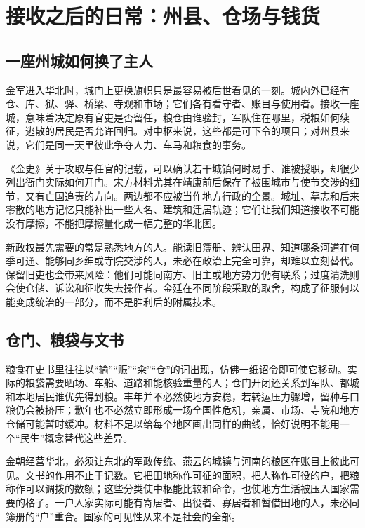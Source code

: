 \section{接收之后的日常：州县、仓场与钱货}

\subsection{一座州城如何换了主人}

金军进入华北时，城门上更换旗帜只是最容易被后世看见的一刻。城内外已经有仓、库、狱、驿、桥梁、寺观和市场；它们各有看守者、账目与使用者。接收一座城，意味着决定原有官吏是否留任，粮仓由谁验封，军队住在哪里，税粮如何续征，逃散的居民是否允许回归。对中枢来说，这些都是可下令的项目；对州县来说，它们是同一天里彼此争夺人力、车马和粮食的事务。

《金史》关于攻取与任官的记载，可以确认若干城镇何时易手、谁被授职，却很少列出衙门实际如何开门。宋方材料尤其在靖康前后保存了被围城市与使节交涉的细节，又有亡国追责的方向。两边都不应被当作地方行政的全景。城址、墓志和后来零散的地方记忆只能补出一些人名、建筑和迁居轨迹；它们让我们知道接收不可能没有摩擦，不能把摩擦量化成一幅完整的华北图。

新政权最先需要的常是熟悉地方的人。能读旧簿册、辨认田界、知道哪条河道在何季可通、能够同乡绅或寺院交涉的人，未必在政治上完全可靠，却难以立刻替代。保留旧吏也会带来风险：他们可能同南方、旧主或地方势力仍有联系；过度清洗则会使仓储、诉讼和征收失去操作者。金廷在不同阶段采取的取舍，构成了征服何以能变成统治的一部分，而不是胜利后的附属技术。

\subsection{仓门、粮袋与文书}

粮食在史书里往往以“输”“赈”“籴”“仓”的词出现，仿佛一纸诏令即可使它移动。实际的粮袋需要晒场、车船、道路和能核验重量的人；仓门开闭还关系到军队、都城和本地居民谁优先得到粮。丰年并不必然使地方安稳，若转运压力骤增，留种与口粮仍会被挤压；歉年也不必然立即形成一场全国性危机，亲属、市场、寺院和地方仓储可能暂时缓冲。材料不足以给每个地区画出同样的曲线，恰好说明不能用一个“民生”概念替代这些差异。

金朝经营华北，必须让东北的军政传统、燕云的城镇与河南的粮区在账目上彼此可见。文书的作用不止于记数。它把田地称作可征的面积，把人称作可役的户，把粮称作可以调拨的数额；这些分类使中枢能比较和命令，也使地方生活被压入国家需要的格子。一户人家实际可能有寄居者、出役者、寡居者和暂借田地的人，未必同簿册的“户”重合。国家的可见性从来不是社会的全部。

